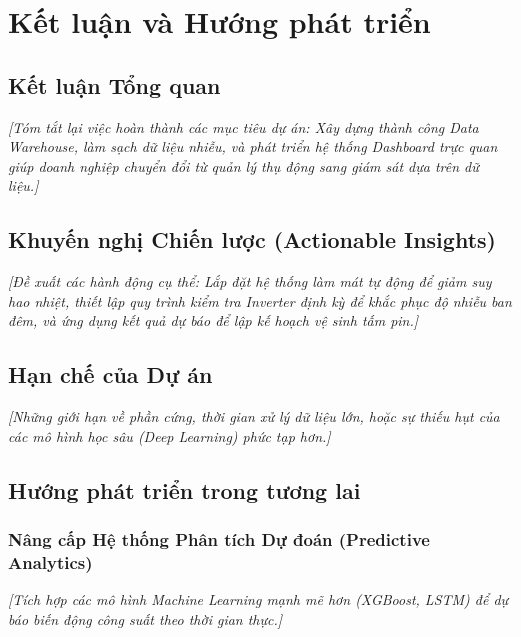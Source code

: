 \documentclass[12pt, a4paper]{report}
\begin{document}


\setcounter{topnumber}{2}
\setcounter{bottomnumber}{1}
\setcounter{totalnumber}{3}
\renewcommand{\topfraction}{0.7}
\renewcommand{\bottomfraction}{0.3}
\renewcommand{\textfraction}{0.2}
\renewcommand{\floatpagefraction}{0.5}


\chapter{Kết luận và Hướng phát triển}
\label{chap:conclusion}

\section{Kết luận Tổng quan}
\label{sec:conclusion}
\textit{[Tóm tắt lại việc hoàn thành các mục tiêu dự án: Xây dựng thành công Data Warehouse, làm sạch dữ liệu nhiễu, và phát triển hệ thống Dashboard trực quan giúp doanh nghiệp chuyển đổi từ quản lý thụ động sang giám sát dựa trên dữ liệu.]}

\section{Khuyến nghị Chiến lược (Actionable Insights)}
\label{sec:recommendations}
\textit{[Đề xuất các hành động cụ thể: Lắp đặt hệ thống làm mát tự động để giảm suy hao nhiệt, thiết lập quy trình kiểm tra Inverter định kỳ để khắc phục độ nhiễu ban đêm, và ứng dụng kết quả dự báo để lập kế hoạch vệ sinh tấm pin.]}

\section{Hạn chế của Dự án}
\label{sec:limitations}
\textit{[Những giới hạn về phần cứng, thời gian xử lý dữ liệu lớn, hoặc sự thiếu hụt của các mô hình học sâu (Deep Learning) phức tạp hơn.]}

\section{Hướng phát triển trong tương lai}
\label{sec:future_work}
\subsection{Nâng cấp Hệ thống Phân tích Dự đoán (Predictive Analytics)}
\textit{[Tích hợp các mô hình Machine Learning mạnh mẽ hơn (XGBoost, LSTM) để dự báo biến động công suất theo thời gian thực.]}
\end{document}
